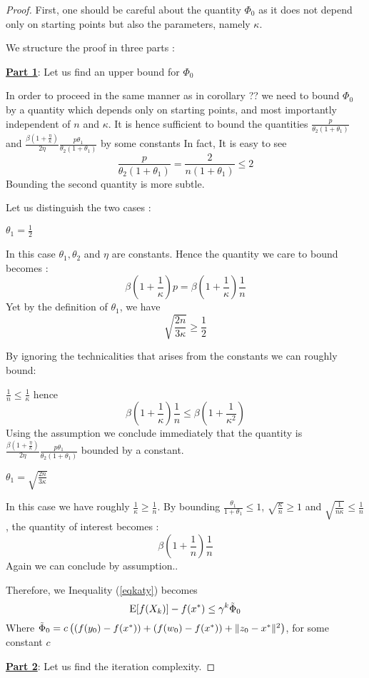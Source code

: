 \documentclass[12pt]{report}
\newcommand{\E}{\mathrm{E}}
\begin{document}
\begin{proof}
First, one should be careful about the quantity $\Phi_0$ as it does not depend only on starting points but also the parameters, namely $\kappa$. 

We structure the proof in three parts :

\textbf{\underline{Part 1}}: Let us find an upper bound for 
    $\Phi_0$
    
In order to proceed in the same manner as in corollary ?? we need to bound $\Phi_0$ by a quantity which depends only on starting points, and most importantly independent of $n$ and $\kappa$. It is hence sufficient to bound the quantities $\frac{p}{\theta_2(1+\theta_1)}$ and $\frac{\beta(1+\frac{\eta}{\kappa})}{2\eta}\frac{p\theta_1}{\theta_2(1+\theta_1)}$  by some constants 
In fact,
It is easy to see
$$\frac{p}{\theta_2(1+\theta_1)}=\frac{2}{n(1+\theta_1)}\leq2 $$ 
Bounding the second quantity is more subtle.

Let us distinguish the two cases :

\underline{$\theta_1=\frac{1}{2}$}


In this case $\theta_1, \theta_2$ and $\eta$ are constants.
Hence the quantity we care to bound becomes :
$$\beta(1+\frac{1}{\kappa})p=\beta(1+\frac{1}{\kappa})\frac{1}{n}$$
Yet by the definition of $\theta_1$, we have $$\sqrt{\frac{2n}{3\kappa}}\geq \frac{1}{2} $$

By ignoring the technicalities that arises from the constants we can roughly bound:

$\frac{1}{n}\leq \frac{1}{\kappa}$
hence 
$$\beta(1+\frac{1}{\kappa})\frac{1}{n}\leq\beta (1+\frac{1}{\kappa^2}) $$
Using the assumption we conclude immediately that the quantity is $\frac{\beta(1+\frac{\eta}{\kappa})}{2\eta}\frac{p\theta_1}{\theta_2(1+\theta_1)}$ bounded by a constant.

\underline{$\theta_1=\sqrt{\frac{2n}{3\kappa}}$}

In this case we have roughly 
$\frac{1}{\kappa} \geq \frac{1}{n}$.
By bounding $\frac{\theta_1}{1+\theta_1}\leq1$, $\sqrt{\frac{\kappa}{n}}\geq1$ and $\sqrt{\frac{1}{n\kappa}}\leq \frac{1}{n}$, the quantity of interest becomes :
$$\beta(1+\frac{1}{n})\frac{1}{n} $$
Again we can conclude by assumption..

Therefore, we Inequality (\ref{eqkaty}) becomes $$\E[f(X_k)] -f(x^*)\leq \gamma^k \Tilde{\Phi}_0$$
Where $ \Tilde{\Phi}_0=c\left((f(y_0)-f(x^*))+(f(w_0)-f(x^*))+\|z_0-x^*\|^2\right)$, for some constant $c$

\textbf{\underline{Part 2}}: Let us find the iteration complexity.


\end{proof}
\end{document}
